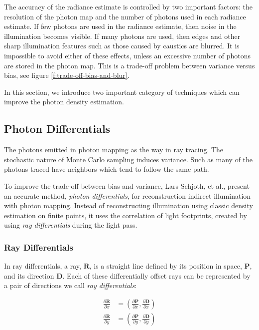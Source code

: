 The accuracy of the radiance estimate is controlled by two important factors: the resolution of the photon map and the number of photons used in each radiance estimate. If few photons are used in the radiance estimate, then noise in the illumination becomes visible. If many photons are used, then edges and other sharp illumination features such as those caused by caustics are blurred. It is impossible to avoid either of these effects, unless an excessive number of photons are stored in the photon map. This is a trade-off problem between variance versus bias, see figure \ref{f:trade-off-bias-and-blur}.

In this section, we introduce two important category of techniques which can improve the photon density estimation.



\subsection{Photon Differentials}\label{sec:photon-differentials}
The photons emitted in photon mapping as the way in ray tracing. The stochastic nature of Monte Carlo sampling induces variance. Such as many of the photons traced have neighbors which tend to follow the same path.

To improve the trade-off between bias and variance, Lars Schjoth, et al., present an accurate method, \textit{photon differentials}, for reconstruction indirect illumination with photon mapping. Instead of reconstructing illumination using classic density estimation on finite points, it uses the correlation of light footprints, created by using \textit{ray differentials} during the light pass. 




\subsubsection{Ray Differentials}
In ray differentials, a ray, $\mathbf{R}$, is a straight line defined by its position in space, $\mathbf{P}$, and its direction $\mathbf{D}$. Each of these differentially offset rays can be represented by a pair of directions we call \textit{ray differentials}\cite{a:TracingRayDifferentials}:

\begin{equation*}
\begin{aligned}
	\frac{\partial\mathbf{R}}{\partial x}&=(\frac{\partial\mathbf{P}}{\partial x},\frac{\partial\mathbf{D}}{\partial x})\\
	\frac{\partial\mathbf{R}}{\partial y}&=(\frac{\partial\mathbf{P}}{\partial y},\frac{\partial\mathbf{D}}{\partial y})
\end{aligned}
\end{equation*}

